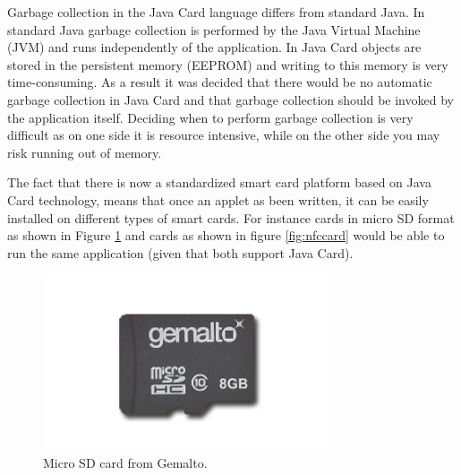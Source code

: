 Garbage collection in the Java Card language differs from standard Java. In standard Java garbage collection is performed by the Java Virtual Machine (JVM) and runs independently of the application. In Java Card objects are stored in the persistent memory (EEPROM) and writing to this memory is very time-consuming. As a result it was decided that there would be no automatic garbage collection in Java Card and that garbage collection should be invoked by the application itself. Deciding when to perform garbage collection is very difficult as on one side it is resource intensive, while on the other side you may risk running out of memory.

The fact that there is now a standardized smart card platform based on Java Card technology, means that once an applet as been written, it can be easily installed on different types of smart cards. For instance cards in micro SD format as shown in Figure \ref{fig:msdcard} and cards as shown in figure \ref{fig:nfccard} would be able to run the same application (given that both support Java Card).


\begin{figure}[h!]
  \caption{Micro SD card from Gemalto.}
  \label{fig:msdcard}
  \centering
    \includegraphics[width=0.75\textwidth]{images/msd.png}
\end{figure}


